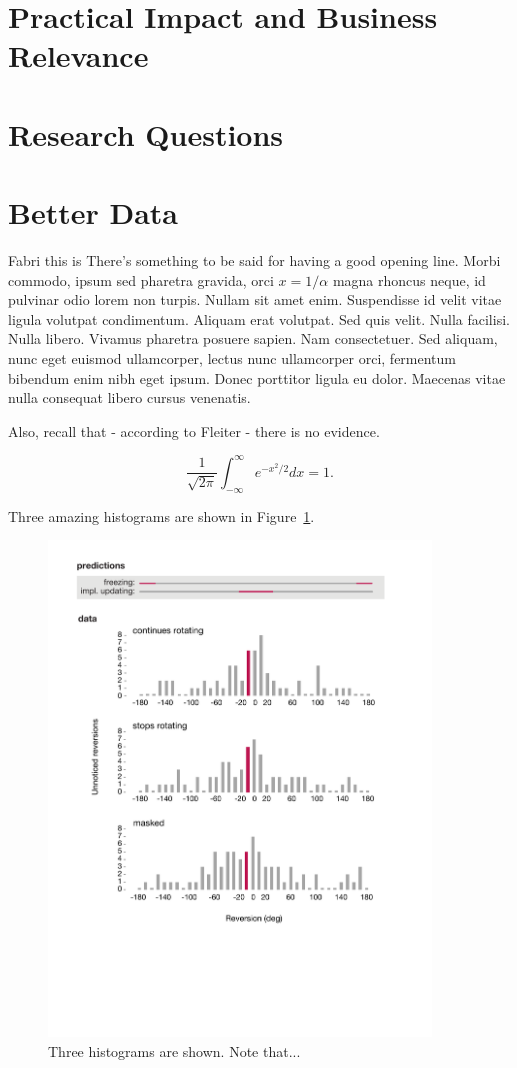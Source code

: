 \section{Practical Impact and Business Relevance}
\section{Research Questions}
\section{Better Data}
Fabri this is There's something to be said for having a good opening line. Morbi commodo, ipsum sed pharetra gravida, orci  $x = 1/\alpha$ magna rhoncus neque, id pulvinar odio lorem non turpis. Nullam sit amet enim. Suspendisse id velit vitae ligula volutpat condimentum. Aliquam erat volutpat. Sed quis velit. Nulla facilisi. Nulla libero. Vivamus pharetra posuere sapien. Nam consectetuer. Sed aliquam, nunc eget euismod ullamcorper, lectus nunc ullamcorper orci, fermentum bibendum enim nibh eget ipsum. Donec porttitor ligula eu dolor. Maecenas vitae nulla consequat libero cursus venenatis. 

Also, recall that - according to Fleiter \cite{Fleiter} - there is no evidence.

$$\frac{1}{\sqrt{2\pi}} \int_{-\infty}^\infty e^{-x^2/2}dx = 1.$$

Three amazing histograms are shown in Figure~\ref{fig:label1}. 
\begin{figure}[htbp]
\begin{center}
\includegraphics[width=4in]{figures/fig2.pdf}
\caption{Three histograms are shown. Note that...}
\label{fig:label1}
\end{center}
\end{figure}
